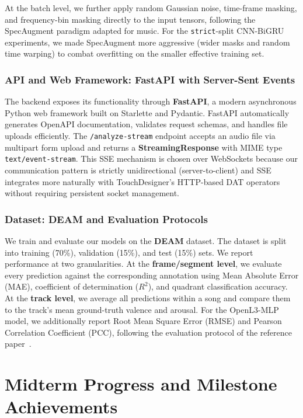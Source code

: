 \documentclass[12pt,a4paper]{article}
\begin{document}
At the batch level, we further apply random Gaussian noise, time-frame masking, and frequency-bin masking directly to the input tensors, following the SpecAugment paradigm adapted for music. For the \texttt{strict}-split CNN-BiGRU experiments, we made SpecAugment more aggressive (wider masks and random time warping) to combat overfitting on the smaller effective training set.

\subsubsection{API and Web Framework: FastAPI with Server-Sent Events}

The backend exposes its functionality through \textbf{FastAPI}, a modern asynchronous Python web framework built on Starlette and Pydantic. FastAPI automatically generates OpenAPI documentation, validates request schemas, and handles file uploads efficiently. The \texttt{/analyze-stream} endpoint accepts an audio file via multipart form upload and returns a \textbf{StreamingResponse} with MIME type \texttt{text/event-stream}. This SSE mechanism is chosen over WebSockets because our communication pattern is strictly unidirectional (server-to-client) and SSE integrates more naturally with TouchDesigner's HTTP-based DAT operators without requiring persistent socket management.

\subsubsection{Dataset: DEAM and Evaluation Protocols}

We train and evaluate our models on the \textbf{DEAM} dataset. The dataset is split into training (70\%), validation (15\%), and test (15\%) sets. We report performance at two granularities. At the \textbf{frame/segment level}, we evaluate every prediction against the corresponding annotation using Mean Absolute Error (MAE), coefficient of determination ($R^2$), and quadrant classification accuracy. At the \textbf{track level}, we average all predictions within a song and compare them to the track's mean ground-truth valence and arousal. For the OpenL3-MLP model, we additionally report Root Mean Square Error (RMSE) and Pearson Correlation Coefficient (PCC), following the evaluation protocol of the reference paper~\cite{lyu2026}.

\section{Midterm Progress and Milestone Achievements}
\end{document}
